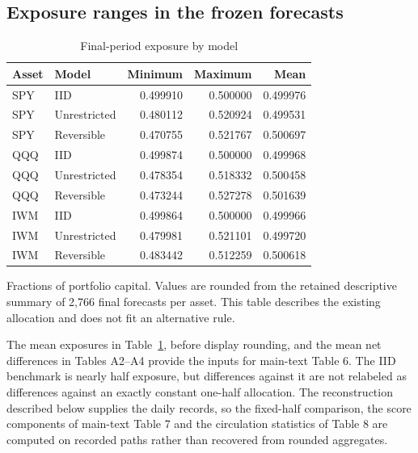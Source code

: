 \subsection{Exposure ranges in the frozen forecasts}
\begin{table}[!htbp]\centering\small\setlength{\tabcolsep}{10pt}
\caption{Final-period exposure by model}\label{tab:weights}
\begin{tabular}{llrrr}\toprule
Asset & Model & Minimum & Maximum & Mean\\\midrule
SPY & IID & 0.499910 & 0.500000 & 0.499976\\
SPY & Unrestricted & 0.480112 & 0.520924 & 0.499531\\
SPY & Reversible & 0.470755 & 0.521767 & 0.500697\\
QQQ & IID & 0.499874 & 0.500000 & 0.499968\\
QQQ & Unrestricted & 0.478354 & 0.518332 & 0.500458\\
QQQ & Reversible & 0.473244 & 0.527278 & 0.501639\\
IWM & IID & 0.499864 & 0.500000 & 0.499966\\
IWM & Unrestricted & 0.479981 & 0.521101 & 0.499720\\
IWM & Reversible & 0.483442 & 0.512259 & 0.500618\\
\bottomrule\end{tabular}
\par\smallskip\parbox{0.98\linewidth}{\footnotesize Fractions of portfolio capital. Values are rounded from the retained descriptive summary of 2,766 final forecasts per asset. This table describes the existing allocation and does not fit an alternative rule.}
\end{table}

The mean exposures in Table~\ref{tab:weights}, before display rounding, and the mean net differences in Tables A2--A4 provide the inputs for main-text Table 6. The IID benchmark is nearly half exposure, but differences against it are not relabeled as differences against an exactly constant one-half allocation. The reconstruction described below supplies the daily records, so the fixed-half comparison, the score components of main-text Table 7 and the circulation statistics of Table 8 are computed on recorded paths rather than recovered from rounded aggregates.








